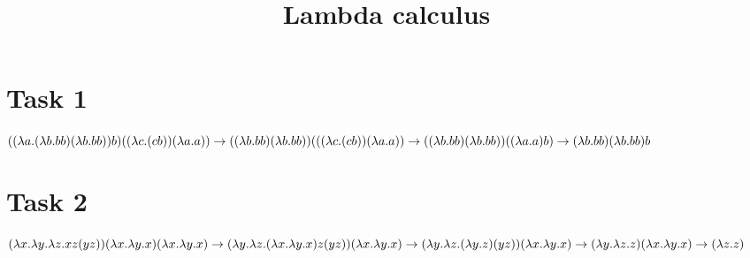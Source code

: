 \documentclass{article}
\title{Lambda calculus}
\date{}
\begin{document}
\maketitle

\section{Task 1}

$ ((\lambda a.(\lambda b.b b) (\lambda b.b b)) b) ((\lambda c.(c b)) (\lambda a.a)) \to 
\\ ((\lambda b.b b) (\lambda b.b b)) (((\lambda c.(c b)) (\lambda a.a)) \to
\\ ((\lambda b.b b) (\lambda b.b b)) ((\lambda a.a) b) \to
\\ (\lambda b.b b) (\lambda b.b b) b$

\section{Task 2}

$(\lambda x.\lambda y.\lambda z.x z (y z)) (\lambda x.\lambda y.x) (\lambda x.\lambda y.x)\to
\\ (\lambda y.\lambda z.(\lambda x.\lambda y.x) z (y z)) (\lambda x.\lambda y.x)\to
\\ (\lambda y.\lambda z.(\lambda y.z) (y z)) (\lambda x.\lambda y.x)\to
\\ (\lambda y.\lambda z.z) (\lambda x.\lambda y.x)\to
\\ (\lambda z.z)$
\end{document}
